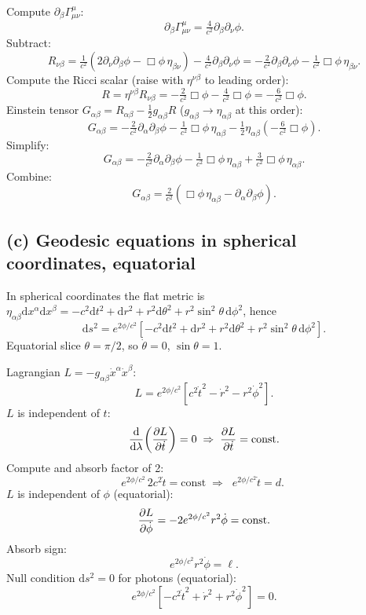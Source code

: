 \documentclass[11pt]{article}
\newcommand{\de}{\mathrm{d}}
\begin{document}
Compute $\partial_\beta\Gamma^\mu_{\mu\nu}$:
\[
\partial_\beta\Gamma^\mu_{\mu\nu} = \tfrac{4}{c^2}\partial_\beta\partial_\nu\phi.
\]
Subtract:
\[
R_{\nu\beta} = \tfrac{1}{c^2}(2\partial_\nu\partial_\beta\phi - \Box\phi\,\eta_{\beta\nu}) - \tfrac{4}{c^2}\partial_\beta\partial_\nu\phi = -\tfrac{2}{c^2}\partial_\beta\partial_\nu\phi - \tfrac{1}{c^2}\Box\phi\,\eta_{\beta\nu}.
\]
Compute the Ricci scalar (raise with $\eta^{\nu\beta}$ to leading order):
\[
R = \eta^{\nu\beta}R_{\nu\beta} = -\tfrac{2}{c^2}\Box\phi - \tfrac{4}{c^2}\Box\phi = -\tfrac{6}{c^2}\Box\phi.
\]
Einstein tensor $G_{\alpha\beta}=R_{\alpha\beta}-\tfrac12 g_{\alpha\beta}R$ ($g_{\alpha\beta}\to\eta_{\alpha\beta}$ at this order):
\[
G_{\alpha\beta} = -\tfrac{2}{c^2}\partial_\alpha\partial_\beta\phi - \tfrac{1}{c^2}\Box\phi\,\eta_{\alpha\beta} - \tfrac12\eta_{\alpha\beta}\!\left(-\tfrac{6}{c^2}\Box\phi\right).
\]
Simplify:
\[
G_{\alpha\beta} = -\tfrac{2}{c^2}\partial_\alpha\partial_\beta\phi - \tfrac{1}{c^2}\Box\phi\,\eta_{\alpha\beta} + \tfrac{3}{c^2}\Box\phi\,\eta_{\alpha\beta}.
\]
Combine:
\begin{equation}
\boxed{\;G_{\alpha\beta} = \tfrac{2}{c^2}\!\left(\Box\phi\,\eta_{\alpha\beta} - \partial_\alpha\partial_\beta\phi\right).\;}
\label{eq:Geinstein}
\end{equation}

\subsection*{(c) Geodesic equations in spherical coordinates, equatorial}

In spherical coordinates the flat metric is $\eta_{\alpha\beta}\de x^\alpha\de x^\beta = -c^2\de t^2+\de r^2+r^2\de\theta^2+r^2\sin^2\theta\,\de\phi^2$, hence
\[
\de s^2 = e^{2\phi/c^2}\!\left[-c^2\de t^2+\de r^2+r^2\de\theta^2+r^2\sin^2\theta\,\de\phi^2\right].
\]
Equatorial slice $\theta=\pi/2$, so $\dot\theta=0$, $\sin\theta=1$.

Lagrangian $L=-g_{\alpha\beta}\dot x^\alpha\dot x^\beta$:
\[
L = e^{2\phi/c^2}\!\left[c^2\dot t^2 - \dot r^2 - r^2\dot\phi^2\right].
\]
$L$ is independent of $t$:
\[
\frac{\de}{\de\lambda}\!\left(\pdv{L}{\dot t}\right) = 0\;\Rightarrow\;\pdv{L}{\dot t}=\text{const}.
\]
Compute and absorb factor of 2:
\[
e^{2\phi/c^2}\,2c^2\dot t = \text{const}\;\Rightarrow\;\boxed{\;e^{2\phi/c^2}\dot t = d.\;}
\]
$L$ is independent of $\phi$ (equatorial):
\[
\pdv{L}{\dot\phi} = -2 e^{2\phi/c^2}r^2\dot\phi = \text{const}.
\]
Absorb sign:
\[
\boxed{\;e^{2\phi/c^2}r^2\dot\phi = \ell.\;}
\]
Null condition $\de s^2=0$ for photons (equatorial):
\begin{equation}
\boxed{\;e^{2\phi/c^2}\!\left[-c^2\dot t^2+\dot r^2+r^2\dot\phi^2\right] = 0.\;}
\label{eq:null}
\end{equation}
\end{document}
